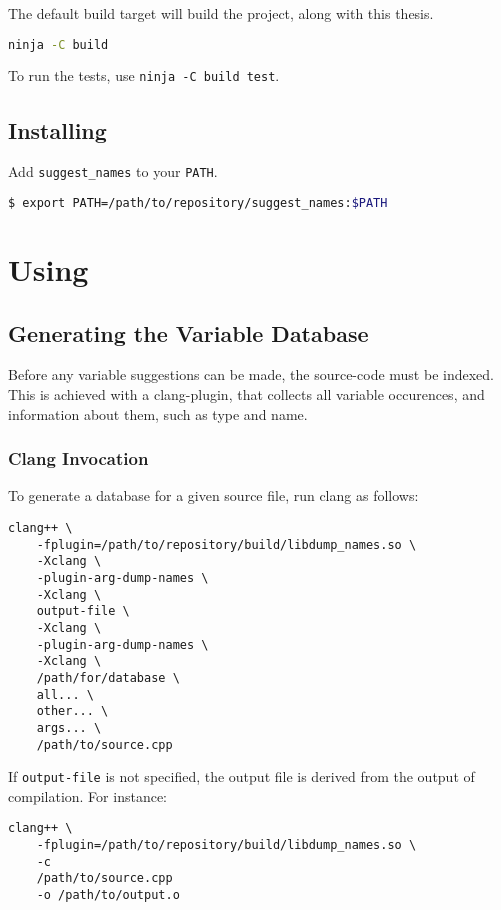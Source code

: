 The default build target will build the project, along with this thesis.
\begin{lstlisting}[language=bash]
ninja -C build
\end{lstlisting}

To run the tests, use \lstinline|ninja -C build test|.

\subsection{Installing}
Add \lstinline|suggest_names| to your \lstinline|PATH|.
\begin{lstlisting}[language=bash]
$ export PATH=/path/to/repository/suggest_names:$PATH
\end{lstlisting}


\section{Using}
\subsection{Generating the Variable Database}
Before any variable suggestions can be made, the source-code must be indexed.
This is achieved with a clang-plugin, that collects all variable occurences,
and information about them, such as type and name.

\subsubsection{Clang Invocation}
To generate a database for a given source file, run clang as follows:

\begin{lstlisting}[caption={Invocation of Clang}]
clang++ \
	-fplugin=/path/to/repository/build/libdump_names.so \
	-Xclang \
	-plugin-arg-dump-names \
	-Xclang \
	output-file \
	-Xclang \
	-plugin-arg-dump-names \
	-Xclang \
	/path/for/database \
	all... \
	other... \
	args... \
	/path/to/source.cpp
\end{lstlisting}

If \lstinline|output-file| is not specified, the output file is derived from the
output of compilation. For instance:

\begin{lstlisting}[caption={Invocation of Clang with Defaulted Output Filename}]
clang++ \
	-fplugin=/path/to/repository/build/libdump_names.so \
	-c
	/path/to/source.cpp
	-o /path/to/output.o
\end{lstlisting}

